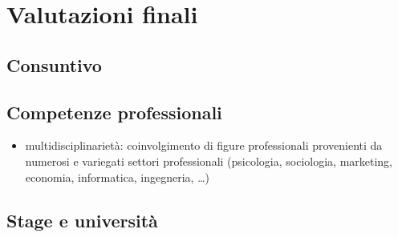 \chapter{Valutazioni finali}
\label{ch:tesi:valutazioni}

\section{Consuntivo}

\section{Competenze professionali}
\begin{itemize}
\item multidisciplinarietà: coinvolgimento di figure professionali provenienti da numerosi e variegati settori professionali (psicologia, sociologia, marketing, economia, informatica, ingegneria, \ldots)
\end{itemize}

\section{Stage e università}
